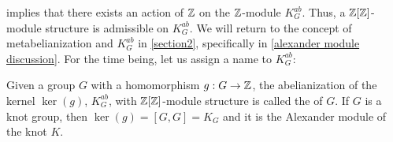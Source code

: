  implies that there exists an action of $\operatorname{\mathbb{Z}}$ on the $\operatorname{\mathbb{Z}}$-module $K_G^{ab}$. Thus, a $\operatorname{\mathbb{Z}}[\operatorname{\mathbb{Z}}]$-module structure is admissible on $K_G^{ab}$. 
We will return to the concept of metabelianization and $K_G^{ab}$ in \cref{section2}, specifically in \cref{alexander module discussion}. For the time being, let us assign a name to $K_G^{ab}$:

\begin{definition}\label{alexander module def}
  Given a group $G$ with a homomorphism $g:G\to \operatorname{\mathbb{Z}}$, the abelianization of the kernel $\ker(g)$, $K_G^{ab}$, with $\operatorname{\mathbb{Z}}[\operatorname{\mathbb{Z}}]$-module structure is called the  of $G$. If $G$ is a knot group, then $\ker(g)=[G, G]=K_G$ and it is the Alexander module of the knot $K$.
\end{definition}




